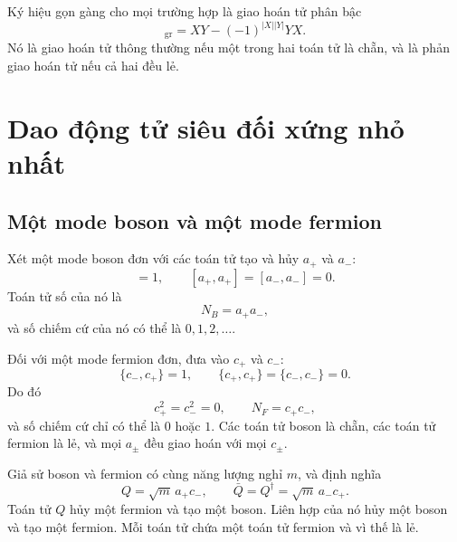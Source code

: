 Ký hiệu gọn gàng cho mọi trường hợp là giao hoán tử phân bậc
\begin{equation}
[X,Y]_{\mathrm{gr}}
=XY-(-1)^{|X||Y|}YX.
\end{equation}
Nó là giao hoán tử thông thường nếu một trong hai toán tử là chẵn, và là phản giao hoán tử nếu cả hai đều lẻ.

\section{Dao động tử siêu đối xứng nhỏ nhất}

\subsection{Một mode boson và một mode fermion}

Xét một mode boson đơn với các toán tử tạo và hủy \(a_+\) và \(a_-\):
\begin{equation}
[a_-,a_+]=1,
\qquad
[a_+,a_+]=[a_-,a_-]=0.
\end{equation}
Toán tử số của nó là
\begin{equation}
N_B=a_+a_-,
\end{equation}
và số chiếm cứ của nó có thể là \(0,1,2,\ldots\).

Đối với một mode fermion đơn, đưa vào \(c_+\) và \(c_-\):
\begin{equation}
\{c_-,c_+\}=1,
\qquad
\{c_+,c_+\}=\{c_-,c_-\}=0.
\end{equation}
Do đó
\begin{equation}
c_+^2=c_-^2=0,
\qquad
N_F=c_+c_-,
\end{equation}
và số chiếm cứ chỉ có thể là \(0\) hoặc \(1\). Các toán tử boson là chẵn, các toán tử fermion là lẻ, và mọi \(a_\pm\) đều giao hoán với mọi \(c_\pm\).


Giả sử boson và fermion có cùng năng lượng nghỉ \(m\), và định nghĩa
\begin{equation}
Q=\sqrt m\,a_+c_-,
\qquad
\bar Q=Q^\dagger=\sqrt m\,a_-c_+.
\end{equation}
Toán tử \(Q\) hủy một fermion và tạo một boson. Liên hợp của nó hủy một boson và tạo một fermion. Mỗi toán tử chứa một toán tử fermion và vì thế là lẻ.

